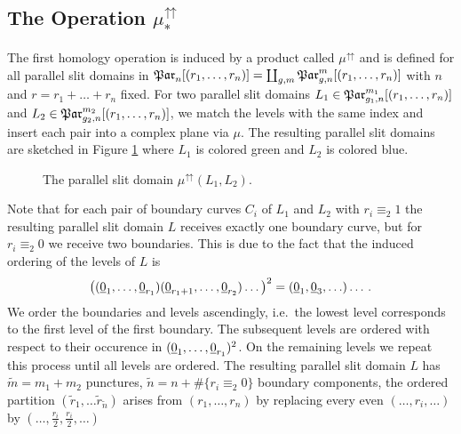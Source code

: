 \subsection{The Operation \texorpdfstring{$\mu^{\upuparrows}_\ast$}{muupuparrows*}}
\label{homology_operations:parallel_patching_slit_pics:construction_of_mu_upuparrows}
The first homology operation is induced by a product called $\mu^{\upuparrows}$
\label{page:shorthand_par_n_r}%
and is defined for all parallel slit domains in $\Par_n[(r_1, \ldots, r_n)] = \coprod_{g,m} \Par_{g,n}^m[(r_1, \ldots, r_n)]$ with $n$ and $r=r_1 + \ldots + r_n$ fixed.
For two parallel slit domains $L_1 \in \Par_{g_1,n}^{m_1}[(r_1, \ldots, r_n)]$ and $L_2 \in \Par_{g_2,n}^{m_2}[(r_1, \ldots, r_n)]$,
we match the levels with the same index and insert each pair into a complex plane via $\mu$.
The resulting parallel slit domains are sketched in Figure \ref{homology_operations:parallel_patching_slit_pics:mu_upuparrows} where $L_1$ is colored green and $L_2$ is colored blue.
\begin{figure}[ht]
    \centering
    \def\svgwidth{.85\columnwidth}
    
    \caption{\label{homology_operations:parallel_patching_slit_pics:mu_upuparrows}The parallel slit domain $\mu^\upuparrows(L_1, L_2)$.}
\end{figure}
Note that for each pair of boundary curves $C_i$ of $L_1$ and $L_2$ with $r_i \equiv_{2} 1$ the resulting parallel slit domain $L$ receives exactly one boundary curve,
but for $r_i \equiv_{2} 0$ we receive two boundaries.
This is due to the fact that the induced ordering of the levels of $L$ is
\[
    \big( ( \ul0_1, \ldots, \ul0_{r_1} )( \ul0_{r_1+1}, \ldots, \ul0_{r_2} ) \ldots \big)^2 = ( \ul0_1, \ul0_3, \ldots ) \ldots \,.
\]
We order the boundaries and levels ascendingly, i.e.\ the lowest level corresponds to the first level of the first boundary.
The subsequent levels are ordered with respect to their occurence in $( \ul0_1, \ldots, \ul0_{r_1} )^2$.
On the remaining levels we repeat this process until all levels are ordered.
The resulting parallel slit domain $L$ has $\tilde m = m_1 + m_2$ punctures,
$\tilde n = n + \#\{ r_i \equiv_2 0\}$ boundary components,
the ordered partition $(\tilde r_1, \ldots \tilde r_{\tilde n})$ arises from $(r_1, \ldots, r_n)$ by replacing every even $(\ldots, r_i, \ldots )$ by $(\ldots, \frac{r_i}{2}, \frac{r_i}{2}, \ldots)$
